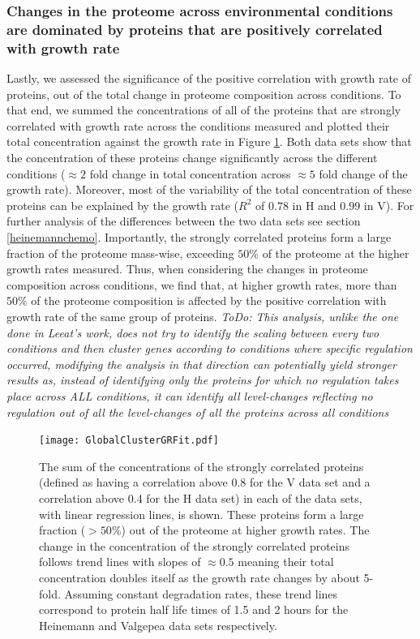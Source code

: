 \documentclass[notitlepage]{article}
\begin{document}
\subsubsection{Changes in the proteome across environmental conditions are dominated by proteins that are positively correlated with growth rate}
Lastly, we assessed the significance of the positive correlation with growth rate of proteins, out of the total change in proteome composition across conditions.
To that end, we summed the concentrations of all of the proteins that are strongly correlated with growth rate across the conditions measured and plotted their total concentration against the growth rate in Figure \ref{fig:globalgrcorr}.
Both data sets show that the concentration of these proteins change significantly across the different conditions ($\approx 2$ fold change in total concentration across $\approx 5$ fold change of the growth rate).
Moreover, most of the variability of the total concentration of these proteins can be explained by the growth rate ($R^2$ of $0.78$ in H and $0.99$ in V). 
For further analysis of the differences between the two data sets see section \ref{heinemannchemo}.
Importantly, the strongly correlated proteins form a large fraction of the proteome mass-wise, exceeding $50\%$ of the proteome at the higher growth rates measured.
Thus, when considering the changes in proteome composition across conditions, we find that, at higher growth rates, more than $50\%$ of the proteome composition is affected by the positive correlation with growth rate of the same group of proteins.
\emph{ToDo: This analysis, unlike the one done in Leeat's work, does not try to identify the scaling between every two conditions and then cluster genes according to conditions where specific regulation occurred, modifying the analysis in that direction can potentially yield stronger results as, instead of identifying only the proteins for which no regulation takes place across ALL conditions, it can identify all level-changes reflecting no regulation out of all the level-changes of all the proteins across all conditions}

\begin{figure}[h]
\centering
\texttt{[image: GlobalClusterGRFit.pdf]}
\caption{
The sum of the concentrations of the strongly correlated proteins (defined as having a correlation above 0.8 for the V data set and a correlation above 0.4 for the H data set) in each of the data sets, with linear regression lines, is shown.
These proteins form a large fraction ($>50\%$) out of the proteome at higher growth rates.
The change in the concentration of the strongly correlated proteins follows trend lines with slopes of $\approx 0.5$ meaning their total concentration doubles itself as the growth rate changes by about 5-fold.
Assuming constant degradation rates, these trend lines correspond to protein half life times of 1.5 and 2 hours for the Heinemann and Valgepea data sets respectively.
}
\label{fig:globalgrcorr}
\end{figure}
\end{document}
